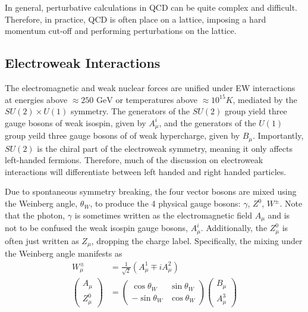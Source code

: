 In general, perturbative calculations in QCD can be quite complex and difficult. Therefore, in practice, QCD is often place on a lattice, imposing a hard momentum cut-off and performing perturbations on the lattice. 

\subsection{Electroweak Interactions}

The electromagnetic and weak nuclear forces are unified under EW interactions at energies above $\approx 250 \text{ GeV}$ or temperatures above $\approx10^{15}$\textdegree $K$, mediated by the $SU(2) \times U(1)$ symmetry. The generators of the $SU(2)$ group yield three gauge bosons of weak isospin, given by $A^i_{\mu}$, and the generators of the $U(1)$ group yeild three gauge bosons of of weak hypercharge, given by $B_{\mu}$. Importantly, $SU(2)$ is the chiral part of the electroweak symmetry, meaning it only affects left-handed fermions. Therefore, much of the discussion on electroweak interactions will differentiate between left handed and right handed particles.

Due to spontaneous symmetry breaking, the four vector bosons are mixed using the Weinberg angle, $\theta_W$, to produce the 4 physical gauge bosons: $\gamma$, $Z^0$, $W^\pm$. Note that the photon, $\gamma$ is sometimes written as the electromagnetic field $A_{\mu}$ and is not to be confused the weak isospin gauge bosons, $A_\mu^i$. Additionally, the $Z^0_{\mu}$ is often just written as $Z_{\mu}$, dropping the charge label. Specifically, the mixing under the Weinberg angle manifests as
\begin{equation}
    \begin{split}
    W^\pm_{\mu} &= \frac{1}{\sqrt{2}}(A^1_{\mu} \mp i A^2_{\mu}) \\
    \begin{pmatrix}
        A_{\mu} \\ Z^0_{\mu}
    \end{pmatrix} &= 
    \begin{pmatrix}
        \cos\theta_W & \sin\theta_W \\
        -\sin\theta_W & \cos\theta_W
    \end{pmatrix}
    \begin{pmatrix}
        B_{\mu} \\ A^3_{\mu}
    \end{pmatrix}
    \label{eq:Weinberg_mixing}
\end{split}
\end{equation}
    

